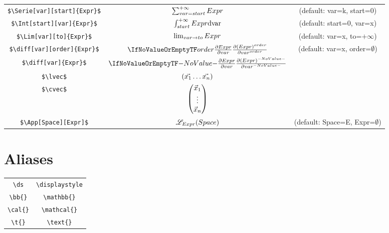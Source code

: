 \documentclass[french]{article}
\begin{document}
\begin{tabular}{|c|c|c|}
    \hline
    \verb|$\Serie[var][start]{Expr}$| & $\Serie[var][start]{Expr}$ & (default: var=k, start=0)\\
    \verb|$\Int[start][var]{Expr}$| & $\Int[start][var]{Expr}$ & (default: start=0, var=x)\\
    \verb|$\Lim[var][to]{Expr}$| & $\Lim[var][to]{Expr}$ & (default: var=x, to=$+\infty$)\\
    \verb|$\diff[var][order]{Expr}$| & $\diff[var][order]{Expr}$ & (default: var=x, order=$\emptyset$)\\
    \verb|$\diff[var]{Expr}$| & $\diff[var]{Expr}$ & \\
    \hline
    \verb|$\lvec$| & $\left(\vec{x_1}\dots\vec{x_n}\right)$ & \\
    \verb|$\cvec$| & $\begin{pmatrix} \vec{x}_{1} \\ \vdots \\ \vec{x}_{n} \end{pmatrix}$ & \\
    \hline
    \verb|$\App[Space][Expr]$| & $\App[Space][Expr]$ & (default: Space=E, Expr=$\emptyset$) \\
    \hline
\end{tabular}

\section{Aliases}

\begin{tabular}{|c|c|}
    \hline
    \verb|\ds| & \verb|\displaystyle| \\
    \verb|\bb{}| & \verb|\mathbb{}| \\
    \verb|\cal{}| & \verb|\mathcal{}| \\
    \verb|\t{}| & \verb|\text{}| \\
    \hline
\end{tabular}
\end{document}
